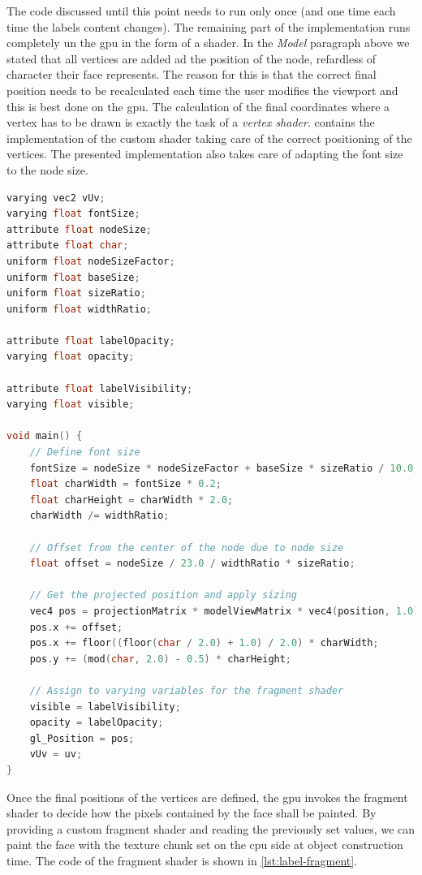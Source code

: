 The code discussed until this point needs to run only once (and one time each time the labels content changes). The remaining part of the implementation runs completely un the \gls{gpu} in the form of a shader. In the \emph{Model} paragraph above we stated that all vertices are added ad the position of the node, refardless of character their face represents. The reason for this is that the correct final position needs to be recalculated each time the user modifies the viewport and this is best done on the \gls{gpu}. The calculation of the final coordinates where a vertex has to be drawn is exactly the task of a \emph{vertex shader}.  contains the implementation of the custom shader taking care of the correct positioning of the vertices. The presented implementation also takes care of adapting the font size to the node size.

\begin{lstlisting}[caption={Vertex shader for the final positioning of the label vertices.},label=lst:label-vertex,language=c]
varying vec2 vUv;
varying float fontSize;
attribute float nodeSize;
attribute float char;
uniform float nodeSizeFactor;
uniform float baseSize;
uniform float sizeRatio;
uniform float widthRatio;

attribute float labelOpacity;
varying float opacity;

attribute float labelVisibility;
varying float visible;

void main() {
    // Define font size
    fontSize = nodeSize * nodeSizeFactor + baseSize * sizeRatio / 10.0;
    float charWidth = fontSize * 0.2;
    float charHeight = charWidth * 2.0;
    charWidth /= widthRatio;

    // Offset from the center of the node due to node size
    float offset = nodeSize / 23.0 / widthRatio * sizeRatio;

    // Get the projected position and apply sizing
    vec4 pos = projectionMatrix * modelViewMatrix * vec4(position, 1.0);
    pos.x += offset;
    pos.x += floor((floor(char / 2.0) + 1.0) / 2.0) * charWidth;
    pos.y += (mod(char, 2.0) - 0.5) * charHeight;

    // Assign to varying variables for the fragment shader
    visible = labelVisibility;
    opacity = labelOpacity;
    gl_Position = pos;
    vUv = uv;
}
\end{lstlisting}

Once the final positions of the vertices are defined, the \gls{gpu} invokes the fragment shader to decide how the pixels contained by the face shall be painted. By providing a custom fragment shader and reading the previously set values, we can paint the face with the texture chunk set on the \gls{cpu} side at object construction time. The code of the fragment shader is shown in \vref{lst:label-fragment}.

